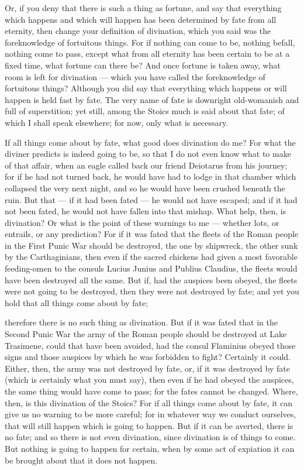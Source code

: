  Or, if you deny that there is such a thing as fortune, and say that everything which happens and which will happen has been determined by fate from all eternity, then change your definition of divination, which you said was the foreknowledge of fortuitous things. For if nothing can come to be, nothing befall, nothing come to pass, except what from all eternity has been certain to be at a fixed time, what fortune can there be? And once fortune is taken away, what room is left for divination — which you have called the foreknowledge of fortuitous things? Although you did say that everything which happens or will happen is held fast by fate. The very name of fate is downright old-womanish and full of superstition; yet still, among the Stoics much is said about that fate; of which I shall speak elsewhere; for now, only what is necessary.

 If all things come about by fate, what good does divination do me? For what the diviner predicts is indeed going to be, so that I do not even know what to make of that affair, when an eagle called back our friend Deiotarus from his journey; for if he had not turned back, he would have had to lodge in that chamber which collapsed the very next night, and so he would have been crushed beneath the ruin. But that — if it had been fated — he would not have escaped; and if it had not been fated, he would not have fallen into that mishap. What help, then, is divination? Or what is the point of these warnings to me — whether lots, or entrails, or any prediction? For if it was fated that the fleets of the Roman people in the First Punic War should be destroyed, the one by shipwreck, the other sunk by the Carthaginians, then even if the sacred chickens had given a most favorable feeding-omen to the consuls Lucius Junius and Publius Claudius, the fleets would have been destroyed all the same. But if, had the auspices been obeyed, the fleets were not going to be destroyed, then they were not destroyed by fate; and yet you hold that all things come about by fate;

 therefore there is no such thing as divination. But if it was fated that in the Second Punic War the army of the Roman people should be destroyed at Lake Trasimene, could that have been avoided, had the consul Flaminius obeyed those signs and those auspices by which he was forbidden to fight? Certainly it could. Either, then, the army was not destroyed by fate, or, if it was destroyed by fate (which is certainly what you must say), then even if he had obeyed the auspices, the same thing would have come to pass; for the fates cannot be changed. Where, then, is this divination of the Stoics? For if all things come about by fate, it can give us no warning to be more careful; for in whatever way we conduct ourselves, that will still happen which is going to happen. But if it can be averted, there is no fate; and so there is not even divination, since divination is of things to come. But nothing is going to happen for certain, when by some act of expiation it can be brought about that it does not happen.

